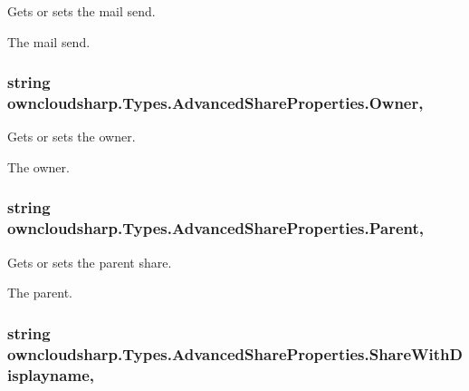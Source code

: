 Gets or sets the mail send. 

The mail send.\hypertarget{classowncloudsharp_1_1_types_1_1_advanced_share_properties_ac490ec6436b080108d9187fc977610f1}{}
\subsubsection[{Owner}]{\setlength{\rightskip}{0pt plus 5cm}string owncloudsharp.\+Types.\+Advanced\+Share\+Properties.\+Owner\hspace{0.3cm}{\ttfamily [get]}, {\ttfamily [set]}}\label{classowncloudsharp_1_1_types_1_1_advanced_share_properties_ac490ec6436b080108d9187fc977610f1}


Gets or sets the owner. 

The owner.\hypertarget{classowncloudsharp_1_1_types_1_1_advanced_share_properties_a893d3b751d049690c57a5d409d6566be}{}
\subsubsection[{Parent}]{\setlength{\rightskip}{0pt plus 5cm}string owncloudsharp.\+Types.\+Advanced\+Share\+Properties.\+Parent\hspace{0.3cm}{\ttfamily [get]}, {\ttfamily [set]}}\label{classowncloudsharp_1_1_types_1_1_advanced_share_properties_a893d3b751d049690c57a5d409d6566be}


Gets or sets the parent share. 

The parent.\hypertarget{classowncloudsharp_1_1_types_1_1_advanced_share_properties_a4fdad7e38248634f5ccb65f0afcd7908}{}
\subsubsection[{Share\+With\+Displayname}]{\setlength{\rightskip}{0pt plus 5cm}string owncloudsharp.\+Types.\+Advanced\+Share\+Properties.\+Share\+With\+Displayname\hspace{0.3cm}{\ttfamily [get]}, {\ttfamily [set]}}\label{classowncloudsharp_1_1_types_1_1_advanced_share_properties_a4fdad7e38248634f5ccb65f0afcd7908}


